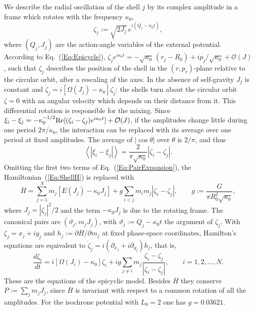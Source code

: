 We describe the radial oscillation of the shell $j$ by its complex amplitude in a frame which rotates with the frequency $\kappa_0$,
\begin{equation}
\zeta_j := \sqrt{2J_j}\, e^{i(Q_j - \kappa_0 t)},
\label{Eq:zetaDef}
\end{equation}
where $(Q_j,J_j)$ are the action-angle variables of the external potential. According to Eq.~(\ref{Eq:Epicycle}), $\zeta_j e^{i\kappa_0 t} = -\sqrt{\kappa_0}\,(r_j - R_0) + i p_j/\sqrt{\kappa_0} + \mathcal{O}(J)$, such that $\zeta_j$ describes the position of the shell in the $(r,p_r)$-plane relative to the circular orbit, after a rescaling of the axes. In the absence of self-gravity $J_j$ is constant and $\dot{\zeta}_j = i[\Omega(J_j) - \kappa_0]\zeta_j$: the shells turn about the circular orbit $\zeta = 0$ with an angular velocity which depends on their distance from it. This differential rotation is responsible for the mixing. Since $\xi_i - \xi_j = -\kappa_0^{-1/2}\mbox{Re}[(\zeta_i - \zeta_j)e^{i\kappa_0 t}] + \mathcal{O}(J)$, if the amplitudes change little during one period $2\pi/\kappa_0$, the interaction can be replaced with its average over one period at fixed amplitudes. The average of $|\cos\theta|$ over $\theta$ is $2/\pi$, and thus
\begin{equation}
\left\langle \left| \xi_i - \xi_j \right| \right\rangle = \frac{2}{\pi\sqrt{\kappa_0}}\left| \zeta_i - \zeta_j \right|.
\label{Eq:AverageFixedL}
\end{equation}
Omitting the first two terms of Eq.~(\ref{Eq:PairExpansion}), the Hamiltonian~(\ref{Eq:ShellH}) is replaced with
\begin{equation}
\overline{H} = \sum\limits_{j=1}^N m_j\left[ E(J_j) - \kappa_0 J_j \right] + g\sum\limits_{i<j} m_i m_j\left| \zeta_i - \zeta_j \right|,\qquad
g := \frac{G}{\pi R_0^2\sqrt{\kappa_0}},
\label{Eq:Hepi}
\end{equation}
where $J_j = |\zeta_j|^2/2$ and the term $-\kappa_0 J_j$ is due to the rotating frame. The canonical pairs are $(\vartheta_j,m_j J_j)$, with $\vartheta_j := Q_j - \kappa_0 t$ the argument of $\zeta_j$. With $\zeta_j = x_j + i y_j$ and $h_j := \partial\overline{H}/\partial m_j$ at fixed phase-space coordinates, Hamilton's equations are equivalent to $\dot{\zeta}_j = i(\partial_{x_j} + i\partial_{y_j})h_j$, that is,
\begin{equation}
\frac{d\zeta_i}{dt} = i\left[ \Omega(J_i) - \kappa_0 \right]\zeta_i
 + i g\sum\limits_{j\neq i} m_j\frac{\zeta_i - \zeta_j}{|\zeta_i - \zeta_j|},\qquad i = 1,2,\ldots,N.
\label{Eq:Epicyclic}
\end{equation}
These are the equations of the epicyclic model. Besides $\overline{H}$ they conserve $P := \sum_j m_j J_j$, since $\overline{H}$ is invariant with respect to a common rotation of all the amplitudes. For the isochrone potential with $L_0 = 2$ one has $g = 0.03621$.

